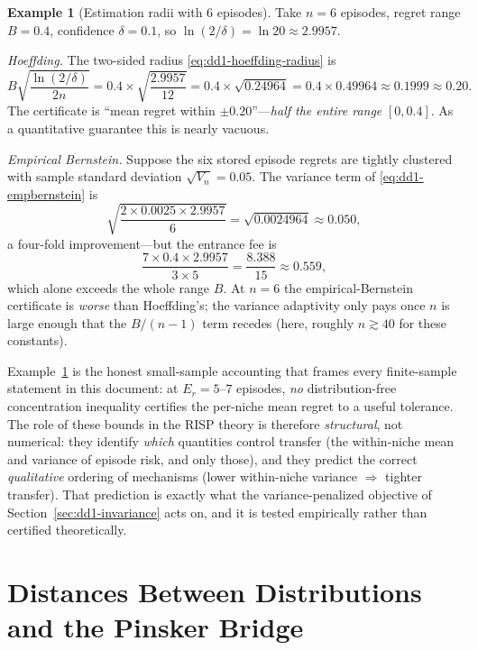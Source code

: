 \documentclass[11pt,a4paper]{article}
\theoremstyle{definition}
\newtheorem{example}{Example}[section]
\theoremstyle{plain}
\newcommand{\nm}{\textsc{RISP}}
\begin{document}
\begin{example}[Estimation radii with $6$ episodes]
\label{ex:dd1-radius}
Take $n = 6$ episodes, regret range $B = 0.4$, confidence $\delta = 0.1$, so
$\ln(2/\delta) = \ln 20 \approx 2.9957$.

\emph{Hoeffding.} The two-sided radius \eqref{eq:dd1-hoeffding-radius} is
\[
B \sqrt{\frac{\ln(2/\delta)}{2n}}
= 0.4 \times \sqrt{\frac{2.9957}{12}}
= 0.4 \times \sqrt{0.24964}
= 0.4 \times 0.49964
\approx 0.1999 \approx 0.20 .
\]
The certificate is ``mean regret within $\pm 0.20$''---\emph{half the entire
range} $[0, 0.4]$. As a quantitative guarantee this is nearly vacuous.

\emph{Empirical Bernstein.} Suppose the six stored episode regrets are
tightly clustered with sample standard deviation $\sqrt{V_n} = 0.05$. The
variance term of \eqref{eq:dd1-empbernstein} is
\[
\sqrt{\frac{2 \times 0.0025 \times 2.9957}{6}}
= \sqrt{0.0024964} \approx 0.050,
\]
a four-fold improvement---but the entrance fee is
\[
\frac{7 \times 0.4 \times 2.9957}{3 \times 5}
= \frac{8.388}{15} \approx 0.559,
\]
which alone exceeds the whole range $B$. At $n = 6$ the empirical-Bernstein
certificate is \emph{worse} than Hoeffding's; the variance adaptivity only
pays once $n$ is large enough that the $B/(n-1)$ term recedes (here, roughly
$n \gtrsim 40$ for these constants).
\end{example}

\begin{warning}
Example~\ref{ex:dd1-radius} is the honest small-sample accounting that frames
every finite-sample statement in this document: at $E_r = 5$--$7$ episodes,
\emph{no} distribution-free concentration inequality certifies the per-niche
mean regret to a useful tolerance. The role of these bounds in the \nm{}
theory is therefore \emph{structural}, not numerical: they identify
\emph{which} quantities control transfer (the within-niche mean and
variance of episode risk, and only those), and they predict the correct
\emph{qualitative} ordering of mechanisms (lower within-niche variance
$\Rightarrow$ tighter transfer). That prediction is exactly what the
variance-penalized objective of Section~\ref{sec:dd1-invariance} acts on, and
it is tested empirically rather than certified theoretically.
\end{warning}

\section{Distances Between Distributions and the Pinsker Bridge}
\label{sec:dd1-distances}
\end{document}
